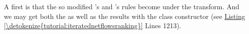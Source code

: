 \documentclass[a4paper,12pt,english]{sphinxhowto}
\begin{document}
A first  is that the so modified ’s and  ’s rules become  under the  transform. And we may get both the  as well as the  results with the  class constructor (see \hyperref[\detokenize{tutorial:iteratednetflowsranking}]{Listing \ref{\detokenize{tutorial:iteratednetflowsranking}}} Lines 12\sphinxhyphen{}13).
\def\sphinxLiteralBlockLabel{\label{\detokenize{tutorial:iteratednetflowsranking}}}
\end{document}

